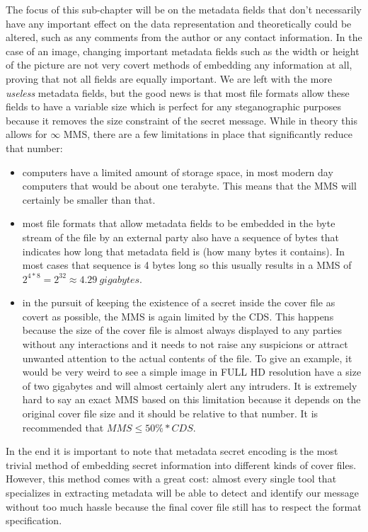 \begin{multicols*}{2}
The focus of this sub-chapter will be on the metadata fields that don't necessarily have any important effect on the data representation and theoretically could be altered, such as any comments from the author or any contact information. In the case of an image, changing important metadata fields such as the width or height of the picture are not very covert methods of embedding any information at all, proving that not all fields are equally important. We are left with the more \textit{useless} metadata fields, but the good news is that most file formats allow these fields to have a variable size which is perfect for any steganographic purposes because it removes the size constraint of the secret message. While in theory this allows for $\infty$ MMS, there are a few limitations in place that significantly reduce that number: 
\begin{itemize}
  \item computers have a limited amount of storage space, in most modern day computers that would be about one terabyte. This means that the MMS will certainly be smaller than that.
  \item most file formats that allow metadata fields to be embedded in the byte stream of the file by an external party also have a sequence of bytes that indicates how long that metadata field is (how many bytes it contains). In most cases that sequence is 4 bytes long so this usually results in a MMS of $2^{4*8} = 2^{32} \approx 4.29\ gigabytes$.
  \item in the pursuit of keeping the existence of a secret inside the cover file as covert as possible, the MMS is again limited by the CDS. This happens because the size of the cover file is almost always displayed to any parties without any interactions and it needs to not raise any suspicions or attract unwanted attention to the actual contents of the file. To give an example, it would be very weird to see a simple image in FULL HD resolution have a size of two gigabytes and will almost certainly alert any intruders. It is extremely hard to say an exact MMS based on this limitation because it depends on the original cover file size and it should be relative to that number. It is recommended that $MMS \leq  50\% * CDS$.
\end{itemize}

In the end it is important to note that metadata secret encoding is the most trivial method of embedding secret information into different kinds of cover files. However, this method comes with a great cost: almost every single tool that specializes in extracting metadata will be able to detect and identify our message without too much hassle because the final cover file still has to respect the format specification.


\end{multicols*}
